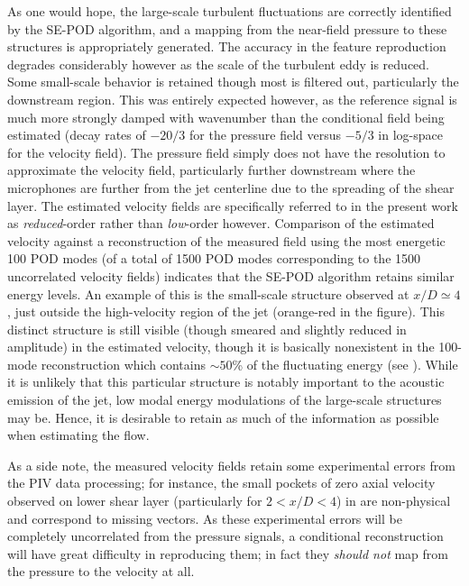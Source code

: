 As one would hope, the large-scale turbulent fluctuations are correctly identified by the SE-POD algorithm, and a mapping from the near-field pressure to these structures is appropriately generated.
The accuracy in the feature reproduction degrades considerably however as the scale of the turbulent eddy is reduced.
Some small-scale behavior is retained though most is filtered out, particularly the downstream region.
This was entirely expected however, as the reference signal is much more strongly damped with wavenumber than the conditional field being estimated (decay rates of $-20/3$ for the pressure field versus $-5/3$ in log-space for the velocity field).
The pressure field simply does not have the resolution to approximate the velocity field, particularly further downstream where the microphones are further from the jet centerline due to the spreading of the shear layer.
The estimated velocity fields are specifically referred to in the present work as \textit{reduced}-order rather than \textit{low}-order however.
Comparison of the estimated velocity against a reconstruction of the measured field using the most energetic 100 POD modes (of a total of 1500 POD modes corresponding to the 1500 uncorrelated velocity fields) indicates that the SE-POD algorithm retains similar energy levels.
An example of this is the small-scale structure observed at $x/D \simeq 4$, just outside the high-velocity region of the jet (orange-red in the figure).
This distinct structure is still visible (though smeared and slightly reduced in amplitude) in the estimated velocity, though it is basically nonexistent in the 100-mode reconstruction which contains $\sim 50$\% of the fluctuating energy (see ).
While it is unlikely that this particular structure is notably important to the acoustic emission of the jet, low modal energy modulations of the large-scale structures may be.
Hence, it is desirable to retain as much of the information as possible when estimating the flow.

As a side note, the measured velocity fields retain some experimental errors from the PIV data processing; for instance, the small pockets of zero axial velocity observed on lower shear layer (particularly for $2 < x/D < 4$) in  are non-physical and correspond to missing vectors. 
As these experimental errors will be completely uncorrelated from the pressure signals, a conditional reconstruction will have great difficulty in reproducing them; in fact they \textit{should not} map from the pressure to the velocity at all.

